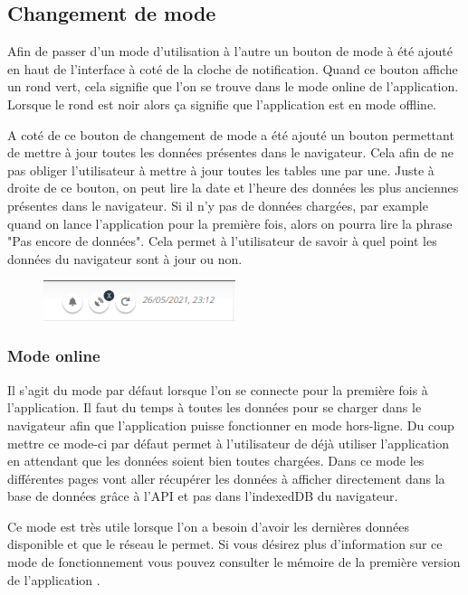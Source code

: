 \documentclass{EPL-master-thesis-covers-FR}
\begin{document}
			\subsection{Changement de mode}
				Afin de passer d'un mode d'utilisation à l'autre un bouton de mode à été ajouté en haut de l'interface à coté de la cloche de notification. Quand ce bouton affiche un rond vert, cela signifie que l'on se trouve dans le mode online de l'application. Lorsque le rond est noir alors ça signifie que l'application est en mode offline.
				
				 A coté de ce bouton de changement de mode a été ajouté un bouton permettant de mettre à jour toutes les données présentes dans le navigateur. Cela afin de ne pas obliger l'utilisateur à mettre à jour toutes les tables une par une. Juste à droite de ce bouton, on peut lire la date et l'heure des données les plus anciennes présentes dans le navigateur. Si il n'y pas de données chargées, par example quand on lance l'application pour la première fois, alors on pourra lire la phrase "Pas encore de données". Cela permet à l'utilisateur de savoir à quel point les données du navigateur sont à jour ou non.
				
				\begin{figure}[H]
					\centering
					\includegraphics[width=0.5\textwidth]{images/buttons}
					\label{fig:buttons}
				\end{figure}
			
			\subsubsection*{Mode online}
				Il s'agit du mode par défaut lorsque l'on se connecte pour la première fois à l'application. Il faut du temps à toutes les données pour se charger dans le navigateur afin que l'application puisse fonctionner en mode hors-ligne. Du coup mettre ce mode-ci par défaut permet à  l'utilisateur de déjà utiliser l'application en attendant que les données soient bien toutes chargées. Dans ce mode les différentes pages vont aller récupérer les données à afficher directement dans la base de données grâce à l'API et pas dans l'indexedDB du navigateur. 
				
				Ce mode est très utile lorsque l'on a besoin d'avoir les dernières données disponible et que le réseau le permet. Si vous désirez plus d'information sur ce mode de fonctionnement vous pouvez consulter le mémoire de la première version de l'application \cite{ref:haitiwater}.
			
\end{document}
